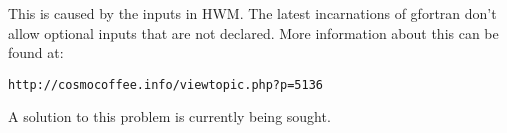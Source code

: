 This is caused by the inputs in HWM.  The latest incarnations of gfortran don't allow optional inputs that are not declared.  More information about this can be found at:

\begin{verbatim}
http://cosmocoffee.info/viewtopic.php?p=5136
\end{verbatim}

A solution to this problem is currently being sought.
